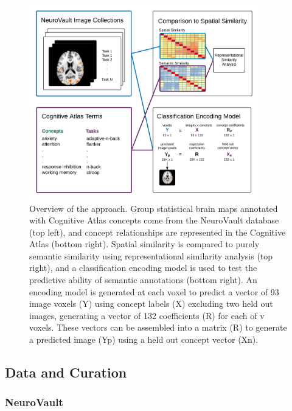 \documentclass{report}
\begin{document}
\begin{figure}[ht!]
\begin{center}
\includegraphics[width=10cm]{images/figure31.png}
\end{center}
\caption{ \label{fig:31} Overview of the approach. Group statistical brain maps
annotated with Cognitive Atlas concepts come from the NeuroVault
database (top left), and concept relationships are represented in the
Cognitive Atlas (bottom right). Spatial similarity is compared to purely
semantic similarity using representational similarity analysis (top
right), and a classification encoding model is used to test the
predictive ability of semantic annotations (bottom right). An encoding
model is generated at each voxel to predict a vector of 93 image voxels
(Y) using concept labels (X) excluding two held out images, generating a
vector of 132 coefficients (R) for each of v voxels. These vectors can
be assembled into a matrix (R) to generate a predicted image (Yp) using
a held out concept vector (Xn).
\newline \newline}
\end{figure} 


\subsection{Data and Curation}

\subsubsection{NeuroVault}
\end{document}
